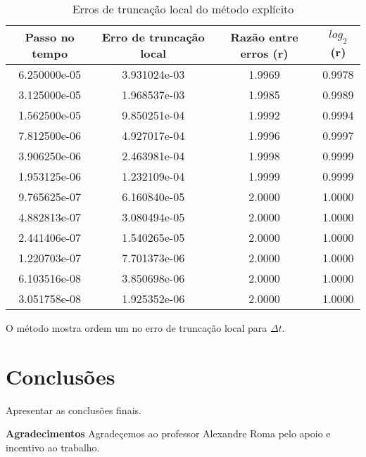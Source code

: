 \documentclass[12pt,fleqn]{article}
\begin{document}
\begin{table}[htb]
\begin{center}
		\begin{tabular}{|c|c|c|c}\hline
			Passo no tempo & Erro de truncação local & Razão entre erros (r) & $log_2$(r) \\\hline
			6.250000e-05 & 3.931024e-03 & 1.9969 & 0.9978\\\hline
			3.125000e-05 & 1.968537e-03 & 1.9985 & 0.9989 \\\hline
			1.562500e-05 & 9.850251e-04 & 1.9992 & 0.9994\\\hline
			7.812500e-06 & 4.927017e-04 & 1.9996 & 0.9997\\\hline
			3.906250e-06 & 2.463981e-04 & 1.9998 & 0.9999\\\hline
			1.953125e-06 & 1.232109e-04 & 1.9999 & 0.9999\\\hline
			9.765625e-07 & 6.160840e-05 & 2.0000 & 1.0000\\\hline
			4.882813e-07 & 3.080494e-05 & 2.0000 & 1.0000 \\\hline
			2.441406e-07 & 1.540265e-05 & 2.0000 & 1.0000 \\\hline
			1.220703e-07 & 7.701373e-06 & 2.0000 & 1.0000 \\\hline
			6.103516e-08 & 3.850698e-06 & 2.0000 & 1.0000 \\\hline
			3.051758e-08 & 1.925352e-06 & 2.0000 & 1.0000 \\\hline
		\end{tabular}
\caption{Erros de truncação local do método explícito}
\end{center}
\end{table}

O método mostra ordem um no erro de truncação local para $\Delta t$.%

\section{Conclusões}
Apresentar as conclusões finais.

\vspace{5mm}
{\bf{Agradecimentos}} Agradeçemos ao professor Alexandre Roma pelo apoio e incentivo ao trabalho.



\end{document}
